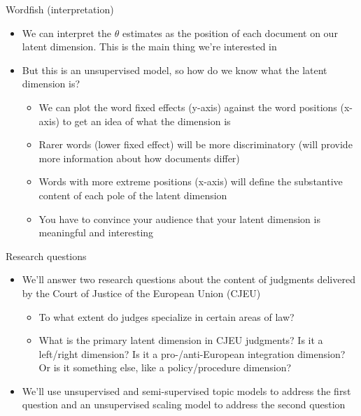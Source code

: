 \documentclass[pdf, 9pt, fleqn, handout]{beamer}
\begin{document}
\begin{frame}{Wordfish (interpretation)}
\begin{itemize}
\item We can interpret the $\theta$ estimates as the position of each document on our latent dimension. This is the main thing we're interested in \\[1em]
\item But this is an unsupervised model, so how do we know what the latent dimension is? \\[0.5em]
\begin{itemize}
\item We can plot the word fixed effects (y-axis) against the word positions (x-axis) to get an idea of what the dimension is \\[1em]
\item Rarer words (lower fixed effect) will be more discriminatory (will provide more information about how documents differ) \\[1em]
\item Words with more extreme positions (x-axis) will define the substantive content of each pole of the latent dimension \\[1em]
\item You have to convince your audience that your latent dimension is meaningful and interesting
\end{itemize}
\end{itemize}
\end{frame}

\begin{frame}{Research questions}
\begin{itemize}
\item We'll answer two research questions about the content of judgments delivered by the Court of Justice of the European Union (CJEU) \\[0.5em]
\begin{itemize}
\item To what extent do judges specialize in certain areas of law? \\[1em]
\item What is the primary latent dimension in CJEU judgments? Is it a left/right dimension? Is it a pro-/anti-European integration dimension? Or is it something else, like a policy/procedure dimension? \\[3em]
\end{itemize}
\item We'll use unsupervised and semi-supervised topic models to address the first question and an unsupervised scaling model to address the second question
\end{itemize}
\end{frame}
\end{document}
